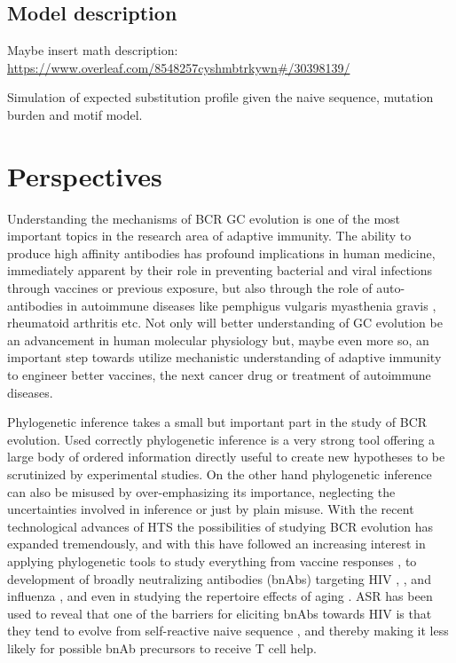 \section{Model description}
Maybe insert math description:
\url{https://www.overleaf.com/8548257cyshmbtrkywn#/30398139/}




Simulation of expected substitution profile given the naive sequence, mutation burden and motif model.








\fi


\chapter{Perspectives}
Understanding the mechanisms of BCR GC evolution is one of the most important topics in the research area of adaptive immunity.
The ability to produce high affinity antibodies has profound implications in human medicine, immediately apparent by their role in preventing bacterial and viral infections through vaccines or previous exposure, but also through the role of auto-antibodies in autoimmune diseases like pemphigus vulgaris \cite{payne2005genetic} myasthenia gravis \cite{lindstrom1998antibody}, rheumatoid arthritis \cite{steiner2002autoantibodies} etc.
Not only will better understanding of GC evolution be an advancement in human molecular physiology but, maybe even more so, an important step towards utilize mechanistic understanding of adaptive immunity to engineer better vaccines, the next cancer drug or treatment of autoimmune diseases.

Phylogenetic inference takes a small but important part in the study of BCR evolution.
Used correctly phylogenetic inference is a very strong tool offering a large body of ordered information directly useful to create new hypotheses to be scrutinized by experimental studies.
On the other hand phylogenetic inference can also be misused by over-emphasizing its importance, neglecting the uncertainties involved in inference or just by plain misuse.
With the recent technological advances of HTS the possibilities of studying BCR evolution has expanded tremendously, and with this have followed an increasing interest in applying phylogenetic tools to study everything from vaccine responses \cite{raymond2016influenza}, to development of broadly neutralizing antibodies (bnAbs) targeting HIV \cite{Doria-Rose2014-vi}, \cite{Wu2011-yj}, \cite{Zhu_undated-zz} and influenza \cite{pappas2014rapid}, \cite{xu2015key} and even in studying the repertoire effects of aging \cite{de2017phylogenetic}.
ASR has been used to reveal that one of the barriers for eliciting bnAbs towards HIV is that they tend to evolve from self-reactive naive sequence \cite{williams2017potent}, \cite{liao2011initial} and thereby making it less likely for possible bnAb precursors to receive T cell help.


